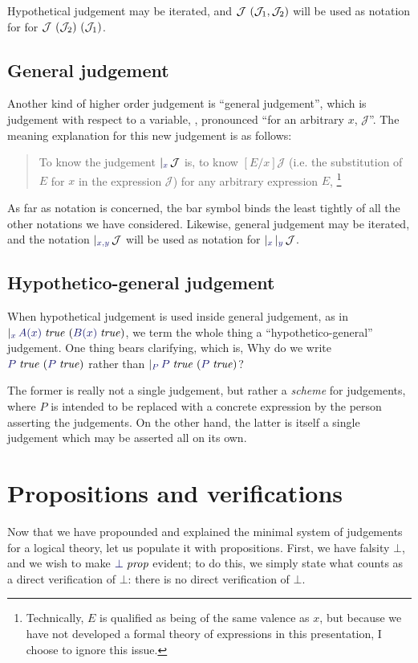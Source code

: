 \documentclass[main.tex]{subfiles}
\begin{document}
Hypothetical judgement may be iterated, and
$\mathcal{J}\ (\mathcal{J}_1,\mathcal{J}_2)$ will be used as notation for
for $\mathcal{J}\ (\mathcal{J}_2)\ (\mathcal{J}_1)$.

\subsection{General judgement}

Another kind of higher order judgement is ``general judgement'', which
is judgement with respect to a variable,
, pronounced ``for an arbitrary $x$,
$\mathcal{J}$''. The meaning explanation for this new judgement is as
follows:

\begin{quote}
  To know the judgement $\genj{x}{\mathcal{J}}$ is, to know
$[E/x]\mathcal{J}$ (i.e. the substitution of $E$ for $x$ in the
expression $\mathcal{J}$) for any arbitrary expression $E$,
\footnote{Technically, $E$ is qualified as being of the same valence
as $x$, but because we have not developed a formal theory of
expressions in this presentation, I choose to ignore this issue.}
\end{quote}

As far as notation is concerned, the bar symbol binds the least
tightly of all the other notations we have considered. Likewise,
general judgement may be iterated, and the notation
$\genj{x,y}{\mathcal{J}}$ will be used as notation for
$\genj{x}{\genj{y}{\mathcal{J}}}$.

\subsection{Hypothetico-general judgement}

When hypothetical judgement is used inside general judgement, as in
$\genj{x}{\hyp{\istrue{A(x)}}{\istrue{B(x)}}}$, we term the whole
thing a ``hypothetico-general'' judgement. One thing bears clarifying,
which is, Why do we write $\hyp{\istrue{P}}{\istrue{P}}$ rather than
$\genj{P}{\hyp{\istrue{P}}{\istrue{P}}}$?

The former is really not a single judgement, but rather a
\emph{scheme} for judgements, where $P$ is intended to be replaced
with a concrete expression by the person asserting the judgements. On
the other hand, the latter is itself a single judgement which may be
asserted all on its own.

\section{Propositions and verifications}
Now that we have propounded and explained the minimal system of judgements for
a logical theory, let us populate it with propositions. First, we have falsity
$\bot$, and we wish to make $\isprop{\bot}$ evident; to do this, we simply state
what counts as a direct verification of $\bot$: there is no
direct verification of $\bot$.
\end{document}
